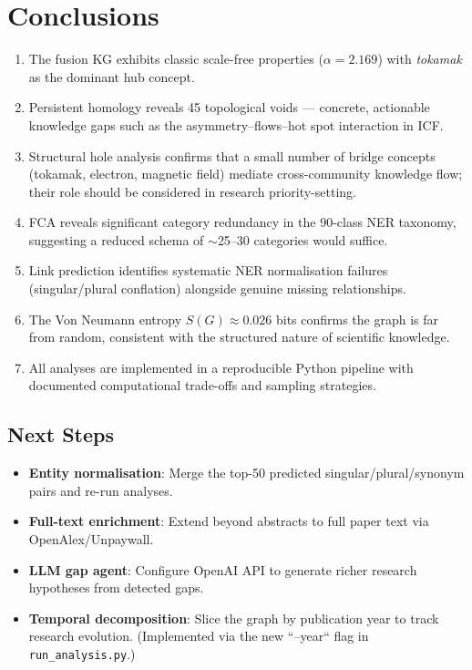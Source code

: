 \documentclass[11pt,a4paper]{article}
\begin{document}
\section{Conclusions}

\begin{enumerate}
  \item The fusion KG exhibits classic scale-free properties ($\alpha = 2.169$) with \emph{tokamak} as the dominant hub concept.
  \item Persistent homology reveals 45 topological voids --- concrete, actionable knowledge gaps such as the asymmetry--flows--hot spot interaction in ICF.
  \item Structural hole analysis confirms that a small number of bridge concepts (tokamak, electron, magnetic field) mediate cross-community knowledge flow; their role should be considered in research priority-setting.
  \item FCA reveals significant category redundancy in the 90-class NER taxonomy, suggesting a reduced schema of $\sim$25--30 categories would suffice.
  \item Link prediction identifies systematic NER normalisation failures (singular/plural conflation) alongside genuine missing relationships.
  \item The Von Neumann entropy $S(G) \approx 0.026$ bits confirms the graph is far from random, consistent with the structured nature of scientific knowledge.
  \item All analyses are implemented in a reproducible Python pipeline with documented computational trade-offs and sampling strategies.
\end{enumerate}

\subsection{Next Steps}

\begin{itemize}
  \item \textbf{Entity normalisation}: Merge the top-50 predicted singular/plural/synonym pairs and re-run analyses.
  \item \textbf{Full-text enrichment}: Extend beyond abstracts to full paper text via OpenAlex/Unpaywall.
  \item \textbf{LLM gap agent}: Configure OpenAI API to generate richer research hypotheses from detected gaps.
  \item \textbf{Temporal decomposition}: Slice the graph by publication year to track research evolution.  (Implemented via the new ``--year`` flag in \texttt{run\_analysis.py}.)
\end{itemize}
\end{document}
